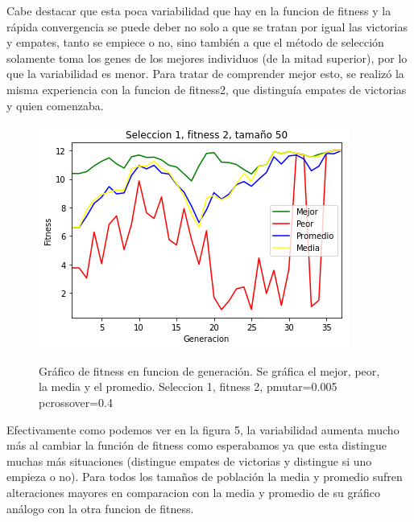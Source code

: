 \documentclass[A4paper,oneside,fleqn,11pt]{article}
\theoremstyle{definition}
\begin{document}
Cabe destacar que esta poca variabilidad que hay en la funcion de fitness y la rápida convergencia se puede deber no solo a que se tratan por igual las victorias y empates, tanto se empiece o no, sino también a que el método de selección solamente toma los genes de los mejores individuos (de la mitad superior), por lo que la variabilidad es menor. Para tratar de comprender mejor esto, se realizó la misma experiencia con la funcion de fitness2, que distinguía empates de victorias y quien comenzaba.





\begin{figure}[H]
	\captionsetup[subfigure]{position=b}
	\centering
		{\includegraphics[width=0.3\linewidth]{s1f2t50.png}}
	\caption{Gráfico de fitness en funcion de generación. Se gráfica el mejor, peor, la media y el promedio. Seleccion 1, fitness 2, pmutar=0.005 pcrossover=0.4}
\end{figure}

Efectivamente como podemos ver en la figura 5, la variabilidad aumenta mucho más al cambiar la función de fitness como esperabamos ya que esta distingue muchas más situaciones (distingue empates de victorias y distingue si uno empieza o no). Para todos los tamaños de población la media y promedio sufren alteraciones mayores en comparacion con la media y promedio de su gráfico análogo con la otra funcion de fitness.
\end{document}
